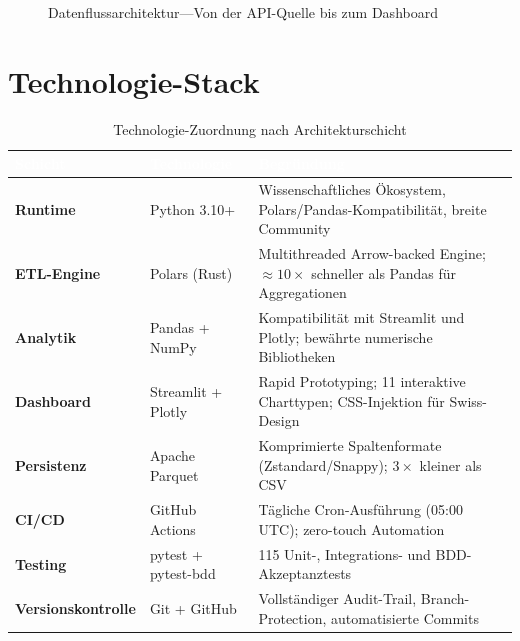 \documentclass[11pt, a4paper, oneside, openany]{report}
\begin{document}
\begin{figure}[H]
{%
}%
\caption{Datenflussarchitektur\;---\;Von der API-Quelle bis zum Dashboard}
\label{fig:architektur}
\end{figure}

\section{Technologie-Stack}

\begin{table}[H]
\centering
\caption{Technologie-Zuordnung nach Architekturschicht}
\label{tab:techstack}
\sffamily\small
\begin{tabularx}{\textwidth}{>{\bfseries}p{2.5cm} p{3.5cm} X}
  \toprule
  \rowcolor{DeepNavy} \textcolor{white}{\textbf{Schicht}} & \textcolor{white}{\textbf{Technologie}} & \textcolor{white}{\textbf{Begründung}} \\
  \midrule
  Runtime          & Python 3.10+         & Wissenschaftliches Ökosystem, Polars/Pandas-Kompatibilität, breite Community \\
  ETL-Engine       & Polars (Rust)        & Multithreaded Arrow-backed Engine; $\approx 10\times$ schneller als Pandas für Aggregationen \\
  Analytik         & Pandas + NumPy       & Kompatibilität mit Streamlit und Plotly; bewährte numerische Bibliotheken \\
  Dashboard        & Streamlit + Plotly   & Rapid Prototyping; 11 interaktive Charttypen; CSS-Injektion für Swiss-Design \\
  Persistenz       & Apache Parquet       & Komprimierte Spaltenformate (Zstandard/Snappy); $3\times$ kleiner als CSV \\
  CI/CD            & GitHub Actions       & Tägliche Cron-Ausführung (05:00\,UTC); zero-touch Automation \\
  Testing          & pytest + pytest-bdd  & 115 Unit-, Integrations- und BDD-Akzeptanztests \\
  Versionskontrolle & Git + GitHub        & Vollständiger Audit-Trail, Branch-Protection, automatisierte Commits \\
  \bottomrule
\end{tabularx}
\end{table}
\end{document}
